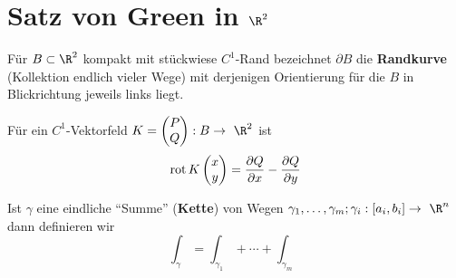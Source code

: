 \section{Satz von Green in \texorpdfstring{$\R^2$}{R2}}
\begin{def*}[note = Randkurve , index = Rand kurve , indexformat = {1.2 1!~-2}]
	Für $B \subset \R^2$ kompakt mit stückwiese $C^1$-Rand bezeichnet $\partial B$ die \textbf{Randkurve} (Kollektion endlich vieler Wege) mit derjenigen Orientierung für die $B$ in Blickrichtung jeweils links liegt.
\end{def*}
\begin{def*}[ note = Rotation , index = Rotation ]
	Für ein $C^1$-Vektorfeld $K = \begin{pmatrix} P \\ Q \end{pmatrix} : B \rightarrow \R^2$ ist
	\[ \operatorname{rot} K\begin{pmatrix} x \\ y \end{pmatrix} = \frac{\partial Q}{\partial x} - \frac{\partial Q}{\partial y} \]
\end{def*}
Ist $\gamma$ eine eindliche \enquote{Summe} (\textbf{Kette}) von Wegen $\gamma_1 , \dotsc , \gamma_m ; \gamma_i : [ a_i , b_i ] \rightarrow \R^n$ dann definieren wir
\[ \int_{\gamma} = \int_{\gamma_1} + \dotsb + \int_{\gamma_m} \]
